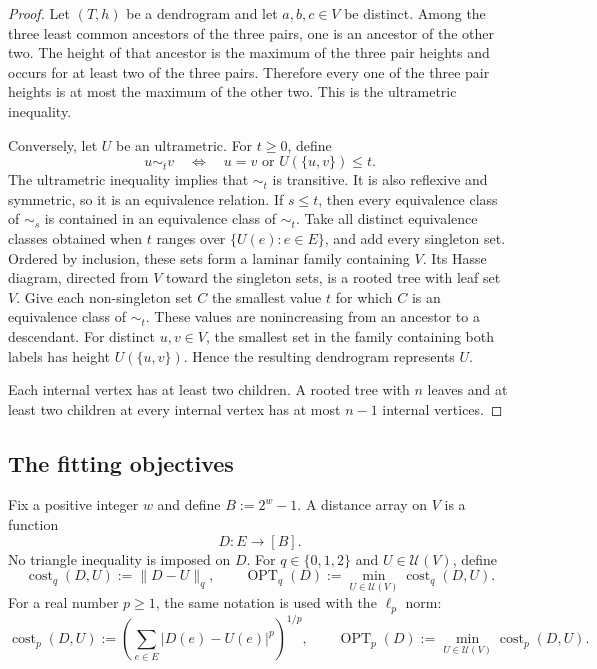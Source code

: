 \documentclass[11pt]{article}
\theoremstyle{definition}
\newcommand{\cU}{\mathcal{U}}
\newcommand{\OPT}{\operatorname{OPT}}
\newcommand{\cost}{\operatorname{cost}}
\begin{document}
\begin{proof}
Let \((T,h)\) be a dendrogram and let \(a,b,c\in V\) be distinct.  Among the
three least common ancestors of the three pairs, one is an ancestor of the
other two.  The height of that ancestor is the maximum of the three pair
heights and occurs for at least two of the three pairs.  Therefore every one
of the three pair heights is at most the maximum of the other two.  This is
the ultrametric inequality.

Conversely, let \(U\) be an ultrametric.  For \(t\ge0\), define
\[
 u\sim_t v
 \quad\Longleftrightarrow\quad
 u=v\text{ or }U(\{u,v\})\le t.
\]
The ultrametric inequality implies that \(\sim_t\) is transitive.  It is also
reflexive and symmetric, so it is an equivalence relation.  If \(s\le t\),
then every equivalence class of \(\sim_s\) is contained in an equivalence
class of \(\sim_t\).  Take all distinct equivalence classes obtained when
\(t\) ranges over \(\{U(e):e\in E\}\), and add every singleton set.  Ordered
by inclusion, these sets form a laminar family containing \(V\).  Its Hasse
diagram, directed from \(V\) toward the singleton sets, is a rooted tree with
leaf set \(V\).  Give each non-singleton set \(C\) the smallest value \(t\)
for which \(C\) is an equivalence class of \(\sim_t\).  These values are
nonincreasing from an ancestor to a descendant.  For distinct \(u,v\in V\),
the smallest set in the family containing both labels has height
\(U(\{u,v\})\).  Hence the resulting dendrogram represents \(U\).

Each internal vertex has at least two children.  A rooted tree with \(n\)
leaves and at least two children at every internal vertex has at most \(n-1\)
internal vertices.
\end{proof}

\subsection{The fitting objectives}

Fix a positive integer \(w\) and define \(B:=2^w-1\).  A distance array on
\(V\) is a function
\[
 D:E\to[B].
\]
No triangle inequality is imposed on \(D\).  For \(q\in\{0,1,2\}\) and
\(U\in\cU(V)\), define
\[
 \cost_q(D,U):=\lVert D-U\rVert_q,
 \qquad
 \OPT_q(D):=\min_{U\in\cU(V)}\cost_q(D,U).
\]
For a real number \(p\ge1\), the same notation is used with the
\(\ell_p\) norm:
\[
 \cost_p(D,U):=
 \left(\sum_{e\in E}|D(e)-U(e)|^p\right)^{1/p},
 \qquad
 \OPT_p(D):=\min_{U\in\cU(V)}\cost_p(D,U).
\]
\end{document}
